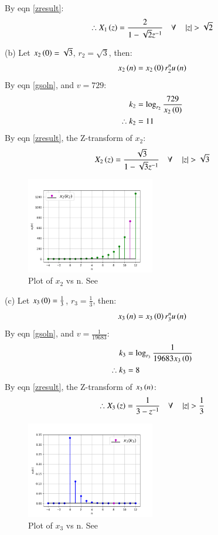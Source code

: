 \documentclass[journal,12pt,twocolumn]{IEEEtran}
\theoremstyle{remark}
\begin{document}
By eqn \ref{zresult}:
\begin{align}
	\therefore X_1\left(z\right) = \frac{2}{1 - \sqrt{2}z^{-1}} \quad \forall \quad \left\vert z\right\vert > \sqrt{2}
\end{align}

(b) Let $x_2\left(0\right) = \sqrt{3}$, $r_2 = \sqrt{3}$, then:
\begin{align}
    x_2\left(n\right) = x_2\left(0\right) r_2^nu\left(n\right)
\end{align}
By eqn \ref{gsoln},  and $v = 729$:
\begin{align}
    k_2 &= \log_{r_2}{\frac{729}{x_2\left(0\right)}} \\
    \therefore k_2 &= 11
\end{align}
By eqn \ref{zresult}, the Z-transform of $x_2$:
\begin{align}
    X_2\left(z\right) = \frac{\sqrt{3}}{1 - \sqrt{3}z^{-1}} \quad \forall \quad \left\vert z\right\vert > \sqrt{3} 
\end{align}

\begin{figure}[h!]
    \renewcommand\thefigure{2}
    \centering
    \includegraphics[width=0.5\textwidth]{figs/b.png}
    \caption[short]{Plot of $x_2$ vs n. See }
    \label{fig:img2}
\end{figure}

(c) Let $x_3\left(0\right) = \frac{1}{3}$, $r_3 = \frac{1}{3}$, then:
\begin{align}
    x_3\left(n\right) = x_3\left(0\right) r_3^nu\left(n\right)
\end{align}
By eqn \ref{gsoln},  and $v = \frac{1}{19683}$:
\begin{align}
    k_3 &= \log_{r_3}{\frac{1}{19683 x_3\left(0\right)}} \\
    \therefore k_3 &= 8
\end{align}
By eqn \ref{zresult}, the Z-transform of $x_3\left(n\right)$:
\begin{align}
    \therefore X_3\left(z\right) = \frac{1}{3 - z^{-1}} \quad \forall \quad \left\vert z\right\vert > \frac{1}{3}
\end{align}

\begin{figure}[h!]
    \renewcommand\thefigure{3}
    \centering
    \includegraphics[width=0.5\textwidth]{figs/c.png}
    \caption[short]{Plot of $x_3$ vs n. See }
    \label{fig:img3}
\end{figure}


\end{document}

